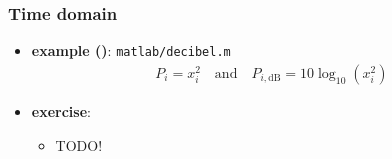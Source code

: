 \begin{frame} %
	\frametitle{Time domain}
	\begin{itemize}
		\item \textbf{example ()}: \texttt{matlab/decibel.m} 
			\begin{align*}
				P_i=x_i^2\quad\textrm{and}\quad P_{i,\textrm{dB}}=10\log_{10}(x_i^2)
			\end{align*}
			\begin{figure}
				\centering
				\begin{subfigure}[c]{0.48\linewidth}
				\end{subfigure}
				\hspace{0.01\linewidth}
				\begin{subfigure}[c]{0.48\linewidth}
				\end{subfigure}
			\end{figure}
		\item \textbf{exercise}:
			\begin{itemize}
				\item TODO!
			\end{itemize}
	\end{itemize}
\end{frame}

